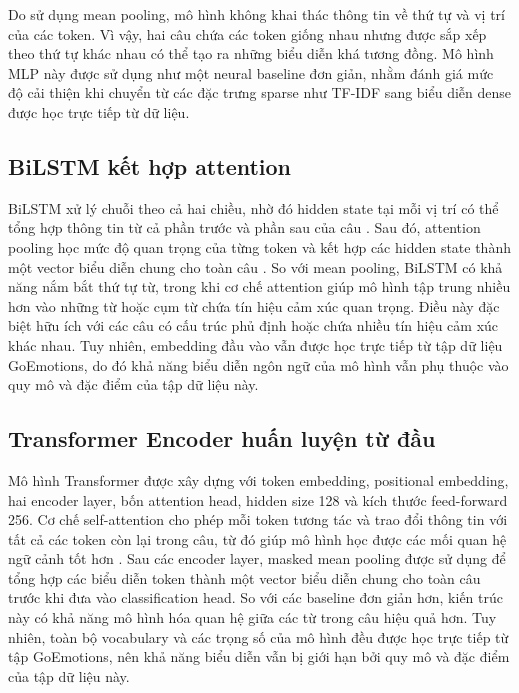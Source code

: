 \documentclass[12pt,a4paper]{article}
\begin{document}
Do sử dụng mean pooling, mô hình không khai thác thông tin về thứ tự và vị trí của các token. Vì vậy, hai câu chứa các token giống nhau nhưng được sắp xếp theo thứ tự khác nhau có thể tạo ra những biểu diễn khá tương đồng. Mô hình MLP này được sử dụng như một neural baseline đơn giản, nhằm đánh giá mức độ cải thiện khi chuyển từ các đặc trưng sparse như TF-IDF sang biểu diễn dense được học trực tiếp từ dữ liệu.

\subsection{BiLSTM kết hợp attention}

BiLSTM xử lý chuỗi theo cả hai chiều, nhờ đó hidden state tại mỗi vị trí có thể tổng hợp thông tin từ cả phần trước và phần sau của câu \cite{hochreiter1997}. Sau đó, attention pooling học mức độ quan trọng của từng token và kết hợp các hidden state thành một vector biểu diễn chung cho toàn câu \cite{bahdanau2015}. So với mean pooling, BiLSTM có khả năng nắm bắt thứ tự từ, trong khi cơ chế attention giúp mô hình tập trung nhiều hơn vào những từ hoặc cụm từ chứa tín hiệu cảm xúc quan trọng. Điều này đặc biệt hữu ích với các câu có cấu trúc phủ định hoặc chứa nhiều tín hiệu cảm xúc khác nhau. Tuy nhiên, embedding đầu vào vẫn được học trực tiếp từ tập dữ liệu GoEmotions, do đó khả năng biểu diễn ngôn ngữ của mô hình vẫn phụ thuộc vào quy mô và đặc điểm của tập dữ liệu này.


\subsection{Transformer Encoder huấn luyện từ đầu}

Mô hình Transformer được xây dựng với token embedding, positional embedding, hai encoder layer, bốn attention head, hidden size 128 và kích thước feed-forward 256. Cơ chế self-attention cho phép mỗi token tương tác và trao đổi thông tin với tất cả các token còn lại trong câu, từ đó giúp mô hình học được các mối quan hệ ngữ cảnh tốt hơn \cite{vaswani2017}. Sau các encoder layer, masked mean pooling được sử dụng để tổng hợp các biểu diễn token thành một vector biểu diễn chung cho toàn câu trước khi đưa vào classification head. So với các baseline đơn giản hơn, kiến trúc này có khả năng mô hình hóa quan hệ giữa các từ trong câu hiệu quả hơn. Tuy nhiên, toàn bộ vocabulary và các trọng số của mô hình đều được học trực tiếp từ tập GoEmotions, nên khả năng biểu diễn vẫn bị giới hạn bởi quy mô và đặc điểm của tập dữ liệu này.
\end{document}
